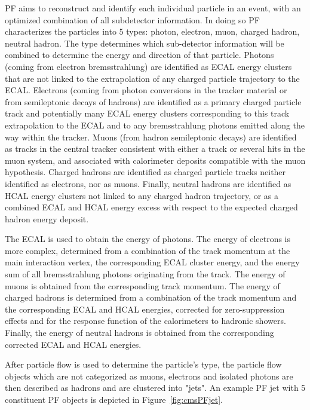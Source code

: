  PF aims to reconstruct and identify each individual particle in an event, with an optimized combination of all subdetector information. In doing so PF characterizes the particles into 5 types: photon, electron, muon, charged hadron, neutral hadron. The type determines which sub-detector information will be combined to determine the energy and direction of that particle. Photons (\eg coming from electron bremsstrahlung) are identified as ECAL energy clusters that are not linked to the extrapolation of any charged particle trajectory to the ECAL. Electrons (\eg coming from photon conversions in the tracker material or from semileptonic decays of hadrons) are identified as a primary charged particle track and potentially many ECAL energy clusters corresponding to this track extrapolation to the ECAL and to any bremsstrahlung photons emitted along the way within the tracker. Muons (\eg from  hadron semileptonic decays) are identified as tracks in the central tracker consistent with either a track or several hits in the muon system, and associated with calorimeter deposits compatible with the muon hypothesis. Charged hadrons are identified as charged particle tracks neither identified as electrons, nor as muons. Finally, neutral hadrons are identified as HCAL energy clusters not linked to any charged hadron trajectory, or as a combined ECAL and HCAL energy excess with respect to the expected charged hadron energy deposit.

The ECAL is used to obtain the energy of photons. The energy of electrons is more complex, determined from a combination of the track momentum at the main interaction vertex, the corresponding ECAL cluster energy, and the energy sum of all bremsstrahlung photons originating from the track. The energy of muons is obtained from the corresponding track momentum. The energy of charged hadrons is determined from a combination of the track momentum and the corresponding ECAL and HCAL energies, corrected for zero-suppression effects and for the response function of the calorimeters to hadronic showers. Finally, the energy of neutral hadrons is obtained from the corresponding corrected ECAL and HCAL energies.

After particle flow is used to determine the particle's type, the particle flow objects which are not categorized as muons, electrons and isolated photons are then described as hadrons and are clustered into "jets". An example PF jet with 5 constituent PF objects is depicted in Figure~\ref{fig:cmsPFjet}.

